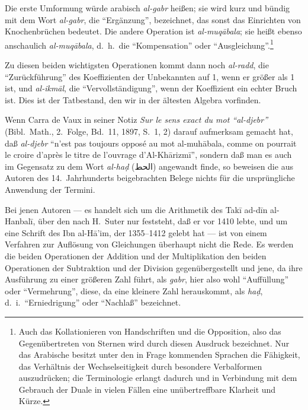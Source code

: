 \documentclass[11pt,a4paper]{article}
\newcommand{\RL}[1]{\beginR#1\endR}
\newcommand{\ar}[1]{{\arabicfont\RL{#1}}}
\newcommand{\enquote}[1]{``#1''}
\begin{document}
Die erste Umformung w\"urde arabisch \textit{al-gabr} hei\ss{}en; sie wird kurz und b\"undig mit dem Wort \textit{al-gabr}, die \enquote{Erg\"anzung}, bezeichnet, das sonst das Einrichten von Knochenbr\"uchen bedeutet. Die andere Operation ist \textit{al-muq\=abala}; sie hei\ss{}t ebenso anschaulich \textit{al-muq\=abala}, d.\ h.\ die \enquote{Kompensation} oder \enquote{Ausgleichung}.\footnote{Auch das Kollationieren von Handschriften und die Opposition, also das Gegen\"ubertreten von Sternen wird durch diesen Ausdruck bezeichnet. Nur das Arabische besitzt unter den in Frage kommenden Sprachen die F\"ahigkeit, das Verh\"altnis der Wechselseitigkeit durch besondere Verbalformen auszudr\"ucken; die Terminologie erlangt dadurch und in Verbindung mit dem Gebrauch der Duale in vielen F\"allen eine un\"ubertreffbare Klarheit und K\"urze.}

Zu diesen beiden wichtigsten Operationen kommt dann noch \textit{al-radd}, die \enquote{Zur\"uckf\"uhrung} des Koeffizienten der Unbekannten auf 1, wenn er gr\"o\ss{}er als 1 ist, und \textit{al-ikm\=al}, die \enquote{Vervollst\"andigung}, wenn der Koeffizient ein echter Bruch ist. Dies ist der Tatbestand, den wir in der \"altesten Algebra vorfinden.

Wenn Carra de Vaux in seiner Notiz \textit{Sur le sens exact du mot \enquote{al-djebr}} (Bibl.\ Math., 2.\ Folge, Bd.\ 11, 1897, S.\ 1, 2) darauf aufmerksam gemacht hat, da\ss{} \textit{al-djebr} \enquote{n'est pas toujours oppos\'e au mot al-muh\=abala, comme on pourrait le croire d'apr\`es le titre de l'ouvrage d'Al-Kh\=arizm\=i}, sondern da\ss{} man es auch im Gegensatz zu dem Wort \textit{al-ha\d{d}} (\ar{الحط}) angewandt finde, so beweisen die aus Autoren des 14.\ Jahrhunderts beigebrachten Belege nichts f\"ur die urspr\"ungliche Anwendung der Termini.

Bei jenen Autoren --- es handelt sich um die Arithmetik des Tak\=i{} ad-d\={i}n al-Hanbal\=i, \"uber den nach H.\ Suter nur feststeht, da\ss{} er vor 1410 lebte, und um eine Schrift des Ibn al-H\=a'im, der 1355--1412 gelebt hat --- ist von einem Verfahren zur Aufl\"osung von Gleichungen \"uberhaupt nicht die Rede. Es werden die beiden Operationen der Addition und der Multiplikation den beiden Operationen der Subtraktion und der Division gegen\"ubergestellt und jene, da ihre Ausf\"uhrung zu einer gr\"o\ss{}eren Zahl f\"uhrt, als \textit{gabr}, hier also wohl \enquote{Auff\"ullung} oder \enquote{Vermehrung}, diese, da eine kleinere Zahl herauskommt, als \textit{ha\d{d}}, d.\ i.\ \enquote{Erniedrigung} oder \enquote{Nachla\ss{}} bezeichnet.
\end{document}
